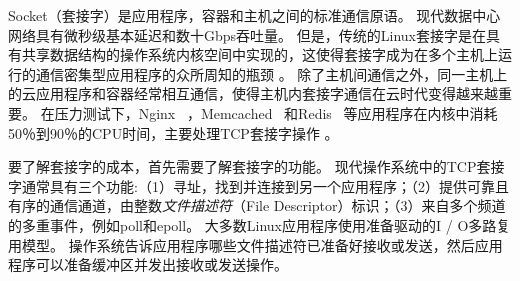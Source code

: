 \iffalse
\begin{figure}
\begin{lstlisting}[style=CStyle]
int lfd = socket(...); // listen file descriptor (fd)
bind(lfd, listen_addr_and_port, ...);
listen(lfd, BACKLOG);
fcntl(lfd, F_SETFL, fcntl(lfd,F_GETFL,0) | O_NONBLOCK);
int efd = epoll_create(MAXEVENTS); // event fd
epoll_ctl(efd, EPOLL_CTL_ADD, lfd, ...);
while (true) { // main event loop
	int n = epoll_wait(efd, events, MAXEVENTS, 0);
	for (int i=0; i<n; i++) { // iterate events
		if (events[i].data.fd == lfd) { // new connection
			int cfd = accept(sfd, ...); // connection fd
			epoll_ctl(efd, EPOLL_CTL_ADD, cfd, ...);
			fcntl(cfd,F_SETFL,fcntl(cfd,F_GETFL,0)|O_NONBLOCK);
		}
		else if (events[i].events & EPOLLIN){//ready to recv
			do { // fetch all received data
				cnt = recv(events[i].data.fd, recvbuf, buflen);
				recvbuf = next_recv_buf();
			} while (cnt > 0);
			// do processing
		}
		else if (events[i].events & EPOLLOUT){//ready to send
			do { // flush send buf
				cnt = send(events[i].data.fd, sendbuf, sendlen);
				sendbuf += cnt; sendlen -= cnt;
			} while (cnt > 0 && sendlen > 0);
		}
	}
}
\end{lstlisting}

\caption{Pseudo-code of a typical socket server application, showing most important socket operations. A socket connection is a FIFO byte-stream channel identified by an integer \emph{file descriptor} (文件描述符). Linux enables a readiness-driven I/O multiplexing model, in which the OS tells application which 文件描述符 are ready to receive or send, then the application may prepare buffers and issue socket operations.}
\label{socksdirect:fig:socket-pseudo-code}

\end{figure}
\fi


Socket（套接字）是应用程序，容器和主机之间的标准通信原语。
现代数据中心网络具有微秒级基本延迟和数十Gbps吞吐量。 但是，传统的Linux套接字是在具有共享数据结构的操作系统内核空间中实现的，这使得套接字成为在多个主机上运行的通信密集型应用程序的众所周知的瓶颈 \cite {barroso2017attack}。 除了主机间通信之外，同一主机上的云应用程序和容器经常相互通信，使得主机内套接字通信在云时代变得越来越重要。 在压力测试下，Nginx~ \cite {reese2008nginx}，Memcached~ \cite {fitzpatrick2004distributed}和Redis~ \cite {carlson2013redis}等应用程序在内核中消耗50％到90％的CPU时间，主要处理TCP套接字操作 \cite{jeong2014mtcp}。

要了解套接字的成本，首先需要了解套接字的功能。
现代操作系统中的TCP套接字通常具有三个功能:（1）寻址，找到并连接到另一个应用程序；（2）提供可靠且有序的通信通道，由整数\emph {文件描述符}（File Descriptor）标识；（3）来自多个频道的多重事件，例如poll和epoll。 大多数Linux应用程序使用准备驱动的I / O多路复用模型。 操作系统告诉应用程序哪些文件描述符已准备好接收或发送，然后应用程序可以准备缓冲区并发出接收或发送操作。


